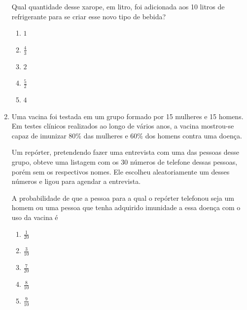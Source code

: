 \documentclass[12pt, a4paper, brazil]{abntex2}
\newcounter{questaovest}
\newcommand{\vest}[1]{\stepcounter{questaovest}\item[\textbf{Questão \arabic{questaovest}} (#1):]}
\begin{document}
\begin{multicols*}{2}
\begin{enumerate}
            Qual quantidade desse xarope, em litro, foi adicionada aos 10 litros de refrigerante para se criar esse novo tipo de bebida?

                \begin{enumerate}
                    \item $1$\vspace{8pt}
                    \item $\displaystyle\frac{4}{3}$\vspace{8pt}
                    \item $2$\vspace{8pt}
                    \item $\displaystyle\frac{5}{2}$\vspace{8pt}
                    \item $4$
                \end{enumerate}

            \columnbreak\vest{ENEM} Uma vacina foi testada em um grupo formado por 15 mulheres e 15 homens. Em testes clínicos realizados ao longo de vários anos, a vacina mostrou-se capaz de imunizar 80\% das mulheres e 60\% dos homens contra uma doença.  

            Um repórter, pretendendo fazer uma entrevista com uma das pessoas desse grupo, obteve uma listagem com os 30 números de telefone dessas pessoas, porém sem os respectivos nomes. Ele escolheu aleatoriamente um desses números e ligou para agendar a entrevista.  

            A probabilidade de que a pessoa para a qual o repórter telefonou seja um homem ou uma pessoa que tenha adquirido imunidade a essa doença com o uso da vacina é
                \begin{enumerate}
                    \item $\displaystyle\frac{1}{20}$\vspace{8pt}
                    \item $\displaystyle\frac{3}{10}$\vspace{8pt}
                    \item $\displaystyle\frac{7}{20}$\vspace{8pt}
                    \item $\displaystyle\frac{8}{10}$\vspace{8pt}
                    \item $\displaystyle\frac{9}{10}$\vspace{8pt}
                \end{enumerate}
            

\end{enumerate}
\end{multicols*}
\end{document}
